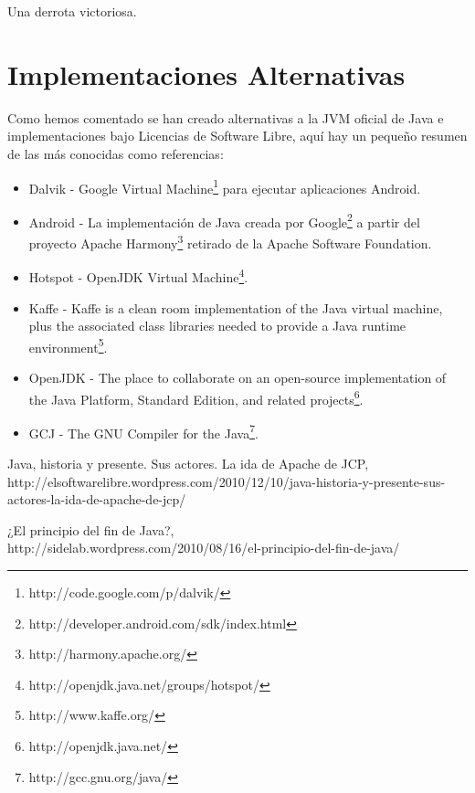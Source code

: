 \documentclass[11pt]{scrartcl}
\begin{document}
Una derrota victoriosa.

\section{Implementaciones Alternativas}

Como hemos comentado se han creado alternativas a la JVM oficial de Java e implementaciones bajo Licencias de Software Libre, aquí hay un pequeño resumen de las más conocidas como referencias:
\begin{itemize}
    \item Dalvik - Google Virtual Machine\footnote{http://code.google.com/p/dalvik/} para ejecutar aplicaciones Android.
    \item Android - La implementación de Java creada por Google\footnote{http://developer.android.com/sdk/index.html} a partir del proyecto Apache Harmony\footnote{http://harmony.apache.org/} retirado de la Apache Software Foundation.
    \item Hotspot - OpenJDK Virtual Machine\footnote{http://openjdk.java.net/groups/hotspot/}.
    \item Kaffe - Kaffe is a clean room implementation of the Java virtual machine, plus the associated class libraries needed to provide a Java runtime environment\footnote{http://www.kaffe.org/}.
    \item OpenJDK - The place to collaborate on an open-source implementation of the Java Platform, Standard Edition, and related projects\footnote{http://openjdk.java.net/}.
    \item GCJ - The GNU Compiler for the Java\footnote{http://gcc.gnu.org/java/}.
\end{itemize}

\begin{thebibliography}{9}

        Java, historia y presente. Sus actores. La ida de Apache de JCP,\\
        http://elsoftwarelibre.wordpress.com/2010/12/10/java-historia-y-presente-sus-actores-la-ida-de-apache-de-jcp/

        ¿El principio del fin de Java?,\\
        http://sidelab.wordpress.com/2010/08/16/el-principio-del-fin-de-java/
\end{thebibliography}
\end{document}
